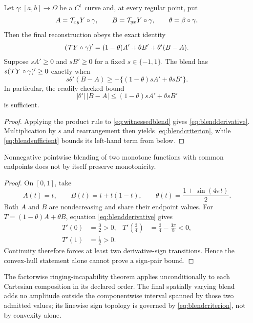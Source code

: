 \begin{proposition}
Let \(\gamma:[a,b]\to\Omega\) be a \(C^1\) curve and, at every regular point,
put
\begin{equation}
 A=\mathcal{T}_{xy}Y\circ\gamma,\qquad
 B=\mathcal{T}_{yx}Y\circ\gamma,\qquad
 \theta=\beta\circ\gamma.
\end{equation}
Then the final reconstruction obeys the exact identity
\begin{equation}
 (\mathcal{T} Y\circ\gamma)'
 =(1-\theta)A'+\theta B'+\theta'(B-A).
 \label{eq:blendderivative}
\end{equation}
Suppose \(sA'\geq0\) and \(sB'\geq0\) for a fixed
\(s\in\{-1,1\}\). The blend has \(s(\mathcal{T} Y\circ\gamma)'\geq0\) exactly when
\begin{equation}
 s\theta'(B-A)
 \geq-\{(1-\theta)sA'+\theta sB'\}.
 \label{eq:blendcriterion}
\end{equation}
In particular, the readily checked bound
\begin{equation}
 |\theta'|\,|B-A|
 \leq(1-\theta)sA'+\theta sB'
 \label{eq:blendsufficient}
\end{equation}
is sufficient.
\end{proposition}

\begin{proof}
Applying the product rule to \eqref{eq:witnessedblend} gives
\eqref{eq:blendderivative}. Multiplication by \(s\) and rearrangement then
yields \eqref{eq:blendcriterion}, while \eqref{eq:blendsufficient} bounds its
left-hand term from below.
\end{proof}

\begin{proposition}
Nonnegative pointwise blending of two monotone functions with common
endpoints does not by itself preserve monotonicity.
\end{proposition}

\begin{proof}
On \([0,1]\), take
\begin{equation}
 A(t)=t,\qquad B(t)=t+t(1-t),\qquad
 \theta(t)=\frac{1+\sin(4\pi t)}{2}.
\end{equation}
Both \(A\) and \(B\) are nondecreasing and share their endpoint values.
For \(T=(1-\theta)A+\theta B\), equation
\eqref{eq:blendderivative} gives
\begin{align}
 T'(0)&=\frac32>0,&
 T'(\tfrac34)&=\frac34-\frac{3\pi}{8}<0,\nonumber\\
 T'(1)&=\frac12>0.&&
\end{align}
Continuity therefore forces at least two derivative-sign transitions. Hence
the convex-hull statement alone cannot prove a sign-pair bound.
\end{proof}

The factorwise ringing-incapability theorem applies unconditionally to each
Cartesian composition in its declared order. The final spatially varying
blend adds no amplitude outside the componentwise interval spanned by those
two admitted values; its linewise sign topology is governed by
\eqref{eq:blendcriterion}, not by convexity alone.
